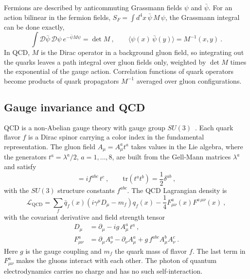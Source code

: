 Fermions are described by anticommuting Grassmann fields $\psi$ and $\bar{\psi}$. For an action bilinear in the fermion fields, $S_F = \int d^4x\,\bar{\psi}\,M\,\psi$, the Grassmann integral can be done exactly,
\begin{equation}
  \int\mathcal{D}\bar\psi\,\mathcal{D}\psi\ e^{-\bar\psi M\psi} = \det M \ ,
  \qquad
  \langle\psi(x)\,\bar\psi(y)\rangle = M^{-1}(x,y) \ .
  \label{eq:grassmann}
\end{equation}
In QCD, $M$ is the Dirac operator in a background gluon field, so integrating out the quarks leaves a path integral over gluon fields only, weighted by $\det M$ times the exponential of the gauge action. Correlation functions of quark operators become products of quark propagators $M^{-1}$ averaged over gluon configurations.

\subsection{Gauge invariance and QCD}
\label{sec:qcd_lagrangian}

QCD is a non-Abelian gauge theory with gauge group $SU(3)$~\cite{Yang:1954ek,Fritzsch:1973pi,Gross:1973id,Politzer:1973fx}. Each quark flavor $f$ is a Dirac spinor carrying a color index in the fundamental representation. The gluon field $A_\mu = A^a_\mu t^a$ takes values in the Lie algebra, where the generators $t^a = \lambda^a/2$, $a=1,\dots,8$, are built from the Gell-Mann matrices $\lambda^a$ and satisfy
\begin{equation}
  [t^a, t^b] = i f^{abc}\, t^c \ ,\qquad \mathrm{tr}\left(t^a t^b\right) = \frac{1}{2}\delta^{ab} \ ,
\end{equation}
with the $SU(3)$ structure constants $f^{abc}$. The QCD Lagrangian density is
\begin{equation}
  \mathcal{L}_{\text{QCD}} = \sum_{f} \bar{q}_f(x)\left(i\gamma^\mu D_\mu - m_f\right) q_f(x) - \frac{1}{4} F^a_{\mu\nu}(x) F^{a\,\mu\nu}(x) \ ,
  \label{eq:qcd_lagrangian}
\end{equation}
with the covariant derivative and field strength tensor
\begin{align}
  D_\mu &= \partial_\mu - i g\, A^a_\mu\, t^a \ , \\
  F^a_{\mu\nu} &= \partial_\mu A^a_\nu - \partial_\nu A^a_\mu + g\, f^{abc} A^b_\mu A^c_\nu \ .
\end{align}
Here $g$ is the gauge coupling and $m_f$ the quark mass of flavor $f$. The last term in $F^a_{\mu\nu}$ makes the gluons interact with each other. The photon of quantum electrodynamics carries no charge and has no such self-interaction.

